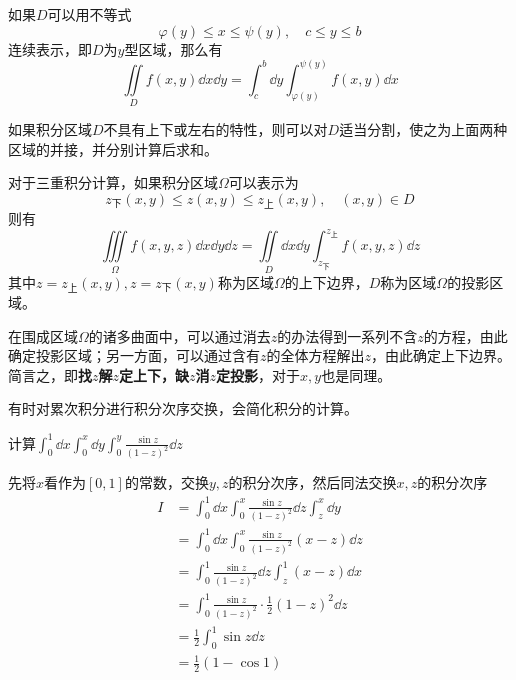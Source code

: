如果$D$可以用不等式
\[ \varphi(y) \leq x \leq \psi(y),\quad c\leq y\leq b \]
连续表示，即$D$为$y$型区域，那么有
\begin{equation}
    \iint\limits_D f(x,y)\dd{x}\dd{y} = \int_c^b \dd{y}\int_{\varphi(y)}^{\psi(y)} f(x,y)\dd{x}
\end{equation}

如果积分区域$D$不具有上下或左右的特性，则可以对$D$适当分割，使之为上面两种区域的并接，并分别计算后求和。

对于三重积分计算，如果积分区域$\Omega$可以表示为
\[ z_\text{下}(x,y)\leq z(x,y) \leq z_\text{上}(x,y),\quad (x,y)\in D \]
则有
\begin{equation}
    \iiint\limits_\Omega f(x,y,z)\dd{x}\dd{y}\dd{z} = \iint\limits_D \dd{x}\dd{y}\int_{z_\text{下}}^{z_\text{上}}f(x,y,z)\dd{z}
\end{equation}
其中$z=z_\text{上}(x,y),z=z_\text{下}(x,y)$称为区域$\Omega$的上下边界，$D$称为区域$\Omega$的投影区域。

在围成区域$\Omega$的诸多曲面中，可以通过消去$z$的办法得到一系列不含$z$的方程，由此确定投影区域；另一方面，可以通过含有$z$的全体方程解出$z$，由此确定上下边界。
简言之，即\textbf{\textsf{找$z$解$z$定上下，缺$z$消$z$定投影}}，对于$x,y$也是同理。

有时对累次积分进行积分次序交换，会简化积分的计算。
\begin{example}
    计算$\displaystyle \int_0^1\dd{x}\int_0^x\dd{y}\int_0^y\frac{\sin z}{(1-z)^2}\dd{z}$
\end{example}
\begin{solution}
    先将$x$看作为$[0,1]$的常数，交换$y,z$的积分次序，然后同法交换$x,z$的积分次序
    \begin{align*}
        I & = \int_0^1\dd{x}\int_0^x\frac{\sin z}{(1-z)^2}\dd{z}\int_z^x\dd{y} \\
          & =\int_0^1\dd{x}\int_0^x\frac{\sin z}{(1-z)^2} (x-z)\dd{z}          \\
          & = \int_0^1\frac{\sin z}{(1-z)^2}\dd{z}\int_z^1(x-z)\dd{x}          \\
          & = \int_0^1 \frac{\sin z}{(1-z)^2} \cdot \frac{1}{2}(1-z)^2\dd{z}   \\
          & = \frac{1}{2}\int_0^1\sin z\dd{z}                                  \\
          & = \frac{1}{2}(1-\cos 1)
    \end{align*}
\end{solution}

